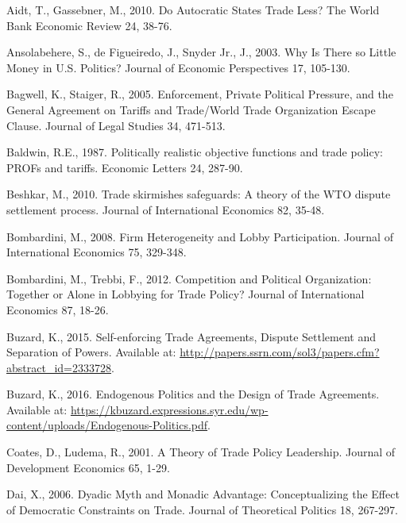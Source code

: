 \documentclass[10pt]{article}
\begin{document}
\begin{list}{}{\setlength{\leftmargin}{0.0in}\setlength{\rightmargin}{0.0in}\setlength{\itemindent}{0.0in}\setlength{\itemsep}{0.1in}}


\item Aidt, T., Gassebner, M., 2010. Do Autocratic States Trade Less? The World Bank Economic Review 24, 38-76.

\item Ansolabehere, S., de Figueiredo, J., Snyder Jr., J., 2003. Why Is There so Little Money in U.S. Politics? Journal of Economic Perspectives 17, 105-130.

\item Bagwell, K., Staiger, R., 2005. Enforcement, Private Political Pressure, and the General Agreement on Tariffs and Trade/World Trade Organization Escape Clause. Journal of Legal Studies 34, 471-513. 

\item Baldwin, R.E., 1987. Politically realistic objective functions and trade policy: PROFs and tariffs. Economic Letters 24, 287-90.

\item Beshkar, M., 2010. Trade skirmishes safeguards: A theory of the WTO dispute settlement process. Journal of International Economics 82, 35-48.

\item Bombardini, M., 2008. Firm Heterogeneity and Lobby Participation. Journal of International Economics 75, 329-348.

\item Bombardini, M., Trebbi, F., 2012. Competition and Political Organization: Together or Alone in Lobbying for Trade Policy? Journal of International Economics 87, 18-26.

\item Buzard, K., 2015. Self-enforcing Trade Agreements, Dispute Settlement and Separation of Powers. Available at: \url{http://papers.ssrn.com/sol3/papers.cfm?abstract_id=2333728}.

\item Buzard, K., 2016. Endogenous Politics and the Design of Trade Agreements. Available at: \url{https://kbuzard.expressions.syr.edu/wp-content/uploads/Endogenous-Politics.pdf}.

\item Coates, D., Ludema, R., 2001. A Theory of Trade Policy Leadership. Journal of Development Economics 65, 1-29.

\item Dai, X., 2006. Dyadic Myth and Monadic Advantage: Conceptualizing the Effect of Democratic Constraints on Trade. Journal of Theoretical Politics 18, 267-297.


\end{list}
\end{document}
